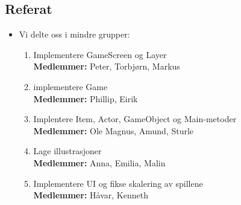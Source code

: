 \documentclass[11pt]{meetingmins}
\begin{document}
\maketitle
\subsection{Referat}

\begin{itemize}
\item Vi delte oss i mindre grupper:
\begin{enumerate}

\item Implementere GameScreen og Layer \\
\textbf{Medlemmer:} Peter, Torbj{\o}rn, Markus

\item implementere Game \\
\textbf{Medlemmer:} Phillip, Eirik

\item Implentere Item, Actor, GameObject og Main-metoder \\
\textbf{Medlemmer:} Ole Magnus, Amund, Sturle

\item Lage illustrasjoner \\
\textbf{Medlemmer:} Anna, Emilia, Malin

\item Implementere UI og fikse skalering av spillene\\
\textbf{Medlemmer:} H{\aa}var, Kenneth

\end{enumerate}
\end{itemize}

%
%

\end{document}

